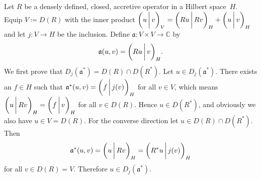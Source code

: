 \documentclass[a4paper,oneside,12pt]{amsart}
\theoremstyle{plain}
\theoremstyle{definition}
\newenvironment{example}
{\pushQED{\qed}

\examplex}
{\popQED\endexamplex}
\begin{document}
\begin{example}\label{ex:astar-nonmacc}
Let $R$ be a densely defined, closed, accretive operator in a Hilbert space~$H$.
Equip $V\coloneqq D(R)$ with the inner product ${{\ifthenelse{\equal{auto}{auto}}{\left({u}\mkern3mu{\biggm|}\mkern3mu {v}\right)}{}
\ifthenelse{\equal{auto}{b}}{\bigl({u}\mkern3mu{\biggm|}\mkern3mu {v}\bigr)}{}
\ifthenelse{\equal{auto}{B}}{\Bigl({u}\mkern3mu{\bigm|}\mkern3mu {v}\Bigr)}{}
}}_V={{\ifthenelse{\equal{auto}{auto}}{\left({Ru}\mkern3mu{\biggm|}\mkern3mu {Rv}\right)}{}
\ifthenelse{\equal{auto}{b}}{\bigl({Ru}\mkern3mu{\biggm|}\mkern3mu {Rv}\bigr)}{}
\ifthenelse{\equal{auto}{B}}{\Bigl({Ru}\mkern3mu{\bigm|}\mkern3mu {Rv}\Bigr)}{}
}}_H+{{\ifthenelse{\equal{auto}{auto}}{\left({u}\mkern3mu{\biggm|}\mkern3mu {v}\right)}{}
\ifthenelse{\equal{auto}{b}}{\bigl({u}\mkern3mu{\biggm|}\mkern3mu {v}\bigr)}{}
\ifthenelse{\equal{auto}{B}}{\Bigl({u}\mkern3mu{\bigm|}\mkern3mu {v}\Bigr)}{}
}}_H$ and let $j\colon V\to H$ be the inclusion. 
Define ${{\mathfrak{{a}}}}\colon V\times V\to{\mathbb{C}}$ by
\[
    {{\mathfrak{{a}}}}(u,v)={{\ifthenelse{\equal{auto}{auto}}{\left({Ru}\mkern3mu{\biggm|}\mkern3mu {v}\right)}{}
\ifthenelse{\equal{auto}{b}}{\bigl({Ru}\mkern3mu{\biggm|}\mkern3mu {v}\bigr)}{}
\ifthenelse{\equal{auto}{B}}{\Bigl({Ru}\mkern3mu{\bigm|}\mkern3mu {v}\Bigr)}{}
}}_H.
\]
We first prove that $D_j({{\mathfrak{{a}}}}^*)=D(R)\cap D(R^*)$.
Let $u\in D_j({{\mathfrak{{a}}}}^*)$. There exists an $f\in H$ such that ${{\mathfrak{{a}}}}^*(u,v)={{\ifthenelse{\equal{auto}{auto}}{\left({f}\mkern3mu{\biggm|}\mkern3mu {j(v)}\right)}{}
\ifthenelse{\equal{auto}{b}}{\bigl({f}\mkern3mu{\biggm|}\mkern3mu {j(v)}\bigr)}{}
\ifthenelse{\equal{auto}{B}}{\Bigl({f}\mkern3mu{\bigm|}\mkern3mu {j(v)}\Bigr)}{}
}}_H$ for all $v\in V$,
which means ${{\ifthenelse{\equal{auto}{auto}}{\left({u}\mkern3mu{\biggm|}\mkern3mu {Rv}\right)}{}
\ifthenelse{\equal{auto}{b}}{\bigl({u}\mkern3mu{\biggm|}\mkern3mu {Rv}\bigr)}{}
\ifthenelse{\equal{auto}{B}}{\Bigl({u}\mkern3mu{\bigm|}\mkern3mu {Rv}\Bigr)}{}
}}_H={{\ifthenelse{\equal{auto}{auto}}{\left({f}\mkern3mu{\biggm|}\mkern3mu {v}\right)}{}
\ifthenelse{\equal{auto}{b}}{\bigl({f}\mkern3mu{\biggm|}\mkern3mu {v}\bigr)}{}
\ifthenelse{\equal{auto}{B}}{\Bigl({f}\mkern3mu{\bigm|}\mkern3mu {v}\Bigr)}{}
}}_H$ for all $v\in D(R)$. Hence $u\in D(R^*)$, and obviously we also have $u\in V=D(R)$.
For the converse direction let $u\in D(R)\cap D(R^*)$. Then 
\[
    {{\mathfrak{{a}}}}^*(u,v)={{\ifthenelse{\equal{auto}{auto}}{\left({u}\mkern3mu{\biggm|}\mkern3mu {Rv}\right)}{}
\ifthenelse{\equal{auto}{b}}{\bigl({u}\mkern3mu{\biggm|}\mkern3mu {Rv}\bigr)}{}
\ifthenelse{\equal{auto}{B}}{\Bigl({u}\mkern3mu{\bigm|}\mkern3mu {Rv}\Bigr)}{}
}}_H={{\ifthenelse{\equal{auto}{auto}}{\left({R^*u}\mkern3mu{\biggm|}\mkern3mu {j(v)}\right)}{}
\ifthenelse{\equal{auto}{b}}{\bigl({R^*u}\mkern3mu{\biggm|}\mkern3mu {j(v)}\bigr)}{}
\ifthenelse{\equal{auto}{B}}{\Bigl({R^*u}\mkern3mu{\bigm|}\mkern3mu {j(v)}\Bigr)}{}
}}_H
\]
for all $v\in D(R)=V$. Therefore $u\in D_j({{\mathfrak{{a}}}}^*)$. 


\end{example}
\end{document}
